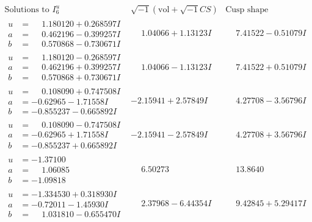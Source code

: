 \documentclass[1p]{elsarticle_modified}
\theoremstyle{definition}
\newcommand{\I}{\sqrt{-1}}
\begin{document}
$$\begin{array}{c|c|c}  
\text{Solutions to }I^u_{6}& \I (\text{vol} + \sqrt{-1}CS) & \text{Cusp shape}\\
 \hline 
\begin{aligned}
u &= \phantom{-}1.180120 + 0.268597 I \\
a &= \phantom{-}0.462196 - 0.399257 I \\
b &= \phantom{-}0.570868 - 0.730671 I\end{aligned}
 & \phantom{-}1.04066 + 1.13123 I & \phantom{-}7.41522 - 0.51079 I \\ \hline\begin{aligned}
u &= \phantom{-}1.180120 - 0.268597 I \\
a &= \phantom{-}0.462196 + 0.399257 I \\
b &= \phantom{-}0.570868 + 0.730671 I\end{aligned}
 & \phantom{-}1.04066 - 1.13123 I & \phantom{-}7.41522 + 0.51079 I \\ \hline\begin{aligned}
u &= \phantom{-}0.108090 + 0.747508 I \\
a &= -0.62965 - 1.71558 I \\
b &= -0.855237 - 0.665892 I\end{aligned}
 & -2.15941 + 2.57849 I & \phantom{-}4.27708 - 3.56796 I \\ \hline\begin{aligned}
u &= \phantom{-}0.108090 - 0.747508 I \\
a &= -0.62965 + 1.71558 I \\
b &= -0.855237 + 0.665892 I\end{aligned}
 & -2.15941 - 2.57849 I & \phantom{-}4.27708 + 3.56796 I \\ \hline\begin{aligned}
u &= -1.37100\phantom{ +0.000000I} \\
a &= \phantom{-}1.06085\phantom{ +0.000000I} \\
b &= -1.09818\phantom{ +0.000000I}\end{aligned}
 & \phantom{-}6.50273\phantom{ +0.000000I} & \phantom{-}13.8640\phantom{ +0.000000I} \\ \hline\begin{aligned}
u &= -1.334530 + 0.318930 I \\
a &= -0.72011 - 1.45930 I \\
b &= \phantom{-}1.031810 - 0.655470 I\end{aligned}
 & \phantom{-}2.37968 - 6.44354 I & \phantom{-}9.42845 + 5.29417 I \\ \hline\begin{aligned}

\end{aligned}
\end{array}$$
\end{document}
